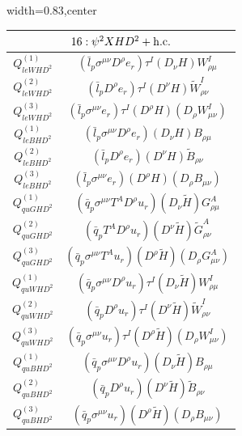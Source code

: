 \begin{table}[H]
\begin{center}
\begin{adjustbox}{width=0.83\textwidth,center}
\small
\begin{minipage}[t]{5.8cm}
\renewcommand{\arraystretch}{1.5}
\begin{tabular}[t]{c|c}
\multicolumn{2}{c}{\boldmath$16:\psi^2XHD^2 + \mathrm{h.c.}$} \\
\hline
$Q_{leWHD^2}^{(1)}$  &  $(\bar l_p \sigma^{\mu\nu} D^\rho e_r) \tau^I (D_\nu H) W^I_{\rho\mu}$ \\
%
$Q_{leWHD^2}^{(2)}$  &  $(\bar l_p D^\rho e_r) \tau^I (D^\nu H) \widetilde W^I_{\rho\nu}$ \\
%
$Q_{leWHD^2}^{(3)}$  &  $(\bar l_p \sigma^{\mu\nu} e_r) \tau^I (D^\rho H) (D_\rho W^I_{\mu\nu})$ \\
%
$Q_{leBHD^2}^{(1)}$  &  $(\bar l_p \sigma^{\mu\nu} D^\rho e_r) (D_\nu H) B_{\rho\mu}$ \\
%
$Q_{leBHD^2}^{(2)}$  &  $(\bar l_p D^\rho e_r) (D^\nu H) \widetilde B_{\rho\nu}$ \\
%
$Q_{leBHD^2}^{(3)}$  &  $(\bar l_p \sigma^{\mu\nu} e_r) (D^\rho H) (D_\rho B_{\mu\nu})$ \\
%
$Q_{quGHD^2}^{(1)}$  &  $(\bar q_p \sigma^{\mu\nu} T^A D^\rho u_r) (D_\nu \widetilde H) G^A_{\rho\mu}$ \\
%
$Q_{quGHD^2}^{(2)}$  &  $(\bar q_p T^A D^\rho u_r) (D^\nu \widetilde H) \widetilde G^A_{\rho\nu}$ \\
%
$Q_{quGHD^2}^{(3)}$  &  $(\bar q_p \sigma^{\mu\nu} T^A u_r) (D^\rho \widetilde H) (D_\rho G^A_{\mu\nu})$ \\
%
$Q_{quWHD^2}^{(1)}$  &  $(\bar q_p \sigma^{\mu\nu} D^\rho u_r) \tau^I (D_\nu \widetilde H) W^I_{\rho\mu}$ \\
%
$Q_{quWHD^2}^{(2)}$  &  $(\bar q_p D^\rho u_r) \tau^I (D^\nu \widetilde H) \widetilde W^I_{\rho\nu}$ \\
%
$Q_{quWHD^2}^{(3)}$  &  $(\bar q_p \sigma^{\mu\nu} u_r) \tau^I (D^\rho \widetilde H) (D_\rho W^I_{\mu\nu})$ \\
%
$Q_{quBHD^2}^{(1)}$  &  $(\bar q_p \sigma^{\mu\nu} D^\rho u_r) (D_\nu \widetilde H) B_{\rho\mu}$ \\
%
$Q_{quBHD^2}^{(2)}$  &  $(\bar q_p D^\rho u_r) (D^\nu \widetilde H) \widetilde B_{\rho\nu}$ \\
%
$Q_{quBHD^2}^{(3)}$  &  $(\bar q_p \sigma^{\mu\nu} u_r) (D^\rho \widetilde H) (D_\rho B_{\mu\nu})$ \\

\end{tabular}
\end{minipage}
\end{adjustbox}
\end{center}
\end{table}
